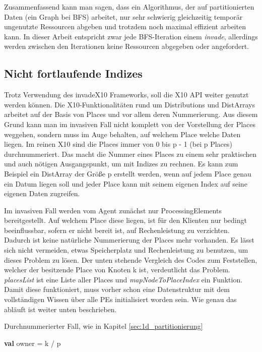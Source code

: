 Zusammenfassend kann man sagen, dass ein Algorithmus, der auf partitionierten Daten (ein Graph bei BFS) arbeitet, nur sehr schwierig gleichzeitig temporär ungenutzte Ressourcen abgeben und trotzdem noch maximal effizient arbeiten kann. In dieser Arbeit entspricht zwar jede BFS-Iteration einem \textit{invade}, allerdings werden zwischen den Iterationen keine Ressourcen abgegeben oder angefordert.

\subsection{Nicht fortlaufende Indizes} %
\label{ssub:nicht_fortlaufende_indizes}
Trotz Verwendung des invadeX10 Frameworks, soll die X10 API weiter genutzt werden können. Die X10-Funktionalitäten rund um Distributions und DistArrays arbeitet auf der Basis von Places und vor allem deren Nummerierung. Aus diesem Grund kann man im invasiven Fall nicht komplett von der Vorstellung der Places weggehen, sondern muss im Auge behalten, auf welchem Place welche Daten liegen. Im reinen X10 sind die Places immer von 0 bis p - 1 (bei p Places) durchnummeriert. Das macht die Nummer eines Places zu einem sehr praktischen und auch nötigen Ausgangspunkt, um mit Indizes zu rechnen. Es kann zum Beispiel ein DistArray der Größe p erstellt werden, wenn auf jedem Place genau ein Datum liegen soll und jeder Place kann mit seinem eigenen Index auf seine eigenen Daten zugreifen.

Im invasiven Fall werden vom Agent zunächst nur ProcessingElements bereitgestellt. Auf welchem Place diese liegen, ist für den Klienten nur bedingt beeinflussbar, sofern er nicht bereit ist, auf Rechenleistung zu verzichten. Dadurch ist keine natürliche Nummerierung der Places mehr vorhanden. Es lässt sich nicht vermeiden, etwas Speicherplatz und Rechenleistung zu benutzen, um dieses Problem zu lösen. Der unten stehende Vergleich des Codes zum Feststellen, welcher der besitzende Place von Knoten k ist, verdeutlicht das Problem. \textit{placesList} ist eine Liste aller Places und \textit{mapNodeToPlaceIndex} ein Funktion. Damit diese funktioniert, muss vorher schon eine Datenstruktur mit dem vollständigen Wissen über alle PEs initialisiert worden sein. Wie genau das abläuft ist weiter unten beschrieben.
\begin{algorithm}
	\caption{Durchnummerierter Fall, wie in Kapitel \ref{sec:1d_partitionierung}}
	\label{alg:owner_consecutive}
	\begin{algorithmic}[1]
		\State \textbf{val} owner = k / p
	\end{algorithmic}
\end{algorithm}

